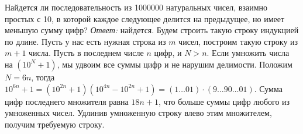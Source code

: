 \problem
Найдется ли последовательность из 1000000 натуральных чисел, взаимно простых с
10, в которой каждое следующее делится на предыдущее, но имеет меньшую сумму
цифр?
\solution
\emph{Ответ:} найдется.
Будем строить такую строку индукцией по длине.
Пусть у нас есть нужная строка из $m$ чисел, построим такую строку из $m + 1$
числа.
Пусть в последнем числе $n$ цифр, и $N > n$.
Если умножить числа на $(10^N + 1)$, мы удвоим все суммы цифр и не нарушим
делимости.
Положим $N = 6 n$, тогда
\(
    10^{6 n} + 1
=
    (10^{2n} + 1) (10^{4n} - 10^{2n} + 1)
=
    (1\ldots01) \cdot (9\ldots90\ldots01)
\).
Сумма цифр последнего множителя равна $18 n + 1$, что больше суммы цифр любого
из умноженных чисел.
Удлинив умноженную строку влево этим множителем, получим требуемую строку.
\endproblem
